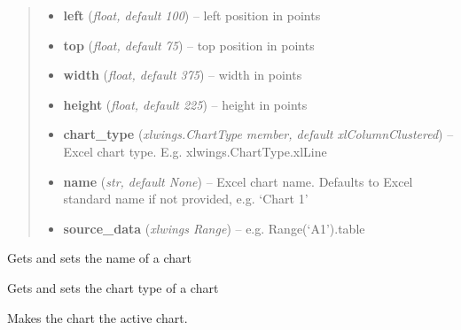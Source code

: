 \documentclass[letterpaper,11pt,english]{sphinxmanual}
\begin{document}
\begin{fulllineitems}
\begin{fulllineitems}
\begin{quote}
\begin{description}
\begin{itemize}
\item {} 
\textbf{left} (\emph{float, default 100}) -- left position in points

\item {} 
\textbf{top} (\emph{float, default 75}) -- top position in points

\item {} 
\textbf{width} (\emph{float, default 375}) -- width in points

\item {} 
\textbf{height} (\emph{float, default 225}) -- height in points

\item {} 
\textbf{chart\_type} (\emph{xlwings.ChartType member, default xlColumnClustered}) -- Excel chart type. E.g. xlwings.ChartType.xlLine

\item {} 
\textbf{name} (\emph{str, default None}) -- Excel chart name. Defaults to Excel standard name if not provided, e.g. `Chart 1'

\item {} 
\textbf{source\_data} (\emph{xlwings Range}) -- e.g. Range(`A1').table

\end{itemize}

\end{description}\end{quote}

\end{fulllineitems}


\begin{fulllineitems}
\label{chart:xlwings.Chart.name}
Gets and sets the name of a chart

\end{fulllineitems}


\begin{fulllineitems}
\label{chart:xlwings.Chart.chart_type}
Gets and sets the chart type of a chart

\end{fulllineitems}


\begin{fulllineitems}
\label{chart:xlwings.Chart.activate}
Makes the chart the active chart.


\end{fulllineitems}
\end{fulllineitems}
\end{document}
